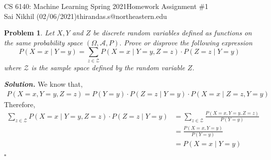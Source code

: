\documentclass[12pt]{article}
\newtheorem{problem}{Problem}
\newenvironment{solution}[1][\it{Solution}]{\textbf{#1. } }{$\square$}
\begin{document}
\noindent CS 6140: Machine Learning Spring 2021\hfill Homework Assignment \#1\\
Sai Nikhil (02/06/2021)\hfill thirandas.s@northeastern.edu

\hrulefill


\begin{problem}
Let $X, Y$ and $Z$ be discrete random variables defined as functions on the same probability space $(\Omega, \mathcal{A}, P) .$ Prove or disprove the following expression
$$
P(X=x \mid Y=y)=\sum_{z \in \mathcal{Z}} P(X=x \mid Y=y, Z=z) \cdot P(Z=z \mid Y=y)
$$
where $\mathcal{Z}$ is the sample space defined by the random variable $Z$.
\end{problem}
\begin{solution}
We know that,
\begin{align*}
P(X=x, Y=y, Z=z)=P(Y=y) \cdot P(Z=z \mid Y=y) \cdot P(X=x \mid Z=z, Y=y)
\end{align*}
Therefore,
\begin{align*}
\sum_{z \in \mathcal{Z}} P(X=x \mid Y=y, Z=z) \cdot P(Z=z \mid Y=y) & = \sum_{z \in \mathcal{Z}} \frac{P(X=x, Y=y, Z=z)}{P(Y=y)}\\
													& = \frac{P(X=x, Y=y)}{P(Y=y)} \\
													& = P(X=x \mid Y=y)
\end{align*}
\end{solution} 
\end{document}
